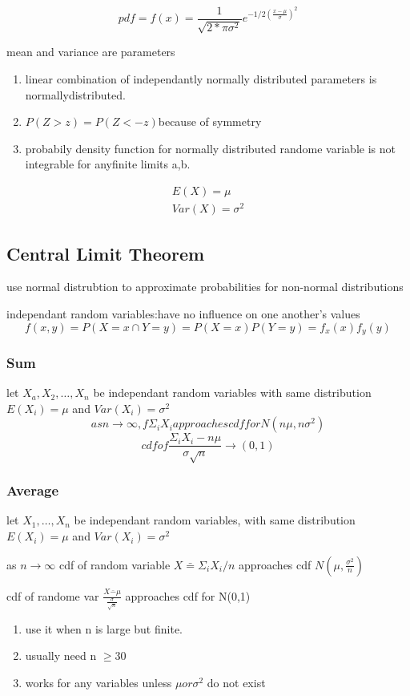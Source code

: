 \documentclass[11pt]{article}
\begin{document}
\begin{equation}
  pdf = f(x) = \frac{1}{\sqrt{2*\pi\sigma^2}}e^{-1/2(\frac{x-\mu}{\sigma})^2}
\end{equation}
\par mean and variance are parameters
\begin{enumerate}
  \item linear combination of independantly normally distributed parameters
    is normallydistributed.
  \item $P(Z>z) = P(Z<-z) $because of symmetry
  \item probabily density function for normally distributed randome variable
    is not integrable for anyfinite limits a,b.

\end{enumerate}
\begin{align*}
  E(X) = \mu\\
  Var(X) = \sigma^2
\end{align*}

\subsection{Central Limit Theorem}
\par use normal distrubtion to approximate probabilities for non-normal
distributions
\par independant random variables:have no influence on one another's values
\begin{equation}
  f(x,y) = P(X=x \cap Y=y) = P(X = x)P(Y=y) = f_x(x) f_y(y)
\end{equation}
\subsubsection{Sum}
\par let $X_a, X_2, \dots, X_n$ be independant random variables with same
distribution $E(X_i) = \mu$ and $Var(X_i) = \sigma^2$
\begin{equation}
  as n\rightarrow \infty,
  f \Sigma_iX_i approaches cdf for N(n\mu, n\sigma^2)
\end{equation}
\begin{equation}
  cdf of \frac{\Sigma_iX_i-n\mu}{\sigma\sqrt{n}} \rightarrow(0,1)
\end{equation}
\subsubsection{Average}
\par let $X_1, \dots, X_n$ be independant random variables, with same
distribution $E(X_i) = \mu$ and $Var(X_i) = \sigma^2$
\par as $n\rightarrow\infty$ cdf of random variable $X\bar = \Sigma_iX_i/n$
approaches cdf $N(\mu, \frac{\sigma^2}{n})$
\par cdf of randome var $\frac{X\bar - \mu}{\frac{\sigma}{\sqrt{n}}}$
approaches cdf for N(0,1)
\begin{enumerate}
  \item use it when n is large but finite.
  \item usually need n $\ge $30
  \item works for any variables unless $\mu or \sigma^2$ do not exist
\end{enumerate}
\end{document}

